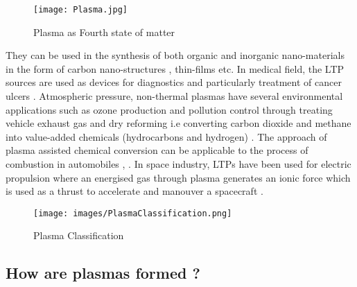 \documentclass[paper=a4, fontsize=13pt]{scrartcl}
\begin{document}


\begin{figure}[t!]
\centering
\texttt{[image: Plasma.jpg]}
  \caption{Plasma as Fourth state of matter \cite{Adamovich2017TheTechnology}}
  \label{fig:Plasm Fourth State}
\end{figure}




They can be used in the synthesis of both organic and inorganic nano-materials in the form of carbon nano-structures \cite{LoPorto2017DirectAntibiotics}, thin-films etc. In medical field, the LTP sources are used as devices for diagnostics and particularly treatment of cancer ulcers \cite{Metelmann2015HeadPlasma}. Atmospheric pressure, non-thermal plasmas have several environmental applications such as ozone production \cite{Eliasson1991ModelingPlasmas} and pollution control through treating vehicle exhaust gas and dry reforming i.e converting carbon dioxide and methane into value-added chemicals (hydrocarbons and hydrogen) \cite{Snoeckx2013Plasma-BasedScale}. The approach of plasma assisted chemical conversion can be applicable to the process of combustion in automobiles \cite{Starikovskaia2006PlasmaCombustion}, \cite{Popov2016KineticsMixtures}. In space industry, LTPs have been used for electric propulsion where an energised gas through plasma generates an ionic force which is used as a thrust to accelerate and manouver a spacecraft \cite{Mazouffre2016ElectricApproaches}.

\begin{figure}
\centering
\texttt{[image: images/PlasmaClassification.png]}
  \caption{Plasma Classification}
  \label{fig:Plasma Classification}
\end{figure}

\subsection{How are plasmas formed ?}
\end{document}
